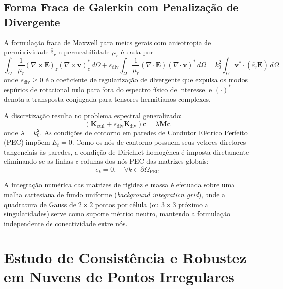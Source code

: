 \documentclass[11pt,a4paper]{article}
\begin{document}
\subsection{Forma Fraca de Galerkin com Penaliza\c{c}\~ao de Divergente}
A formula\c{c}\~ao fraca de Maxwell para meios gerais com anisotropia de permissividade $\overline{\overline{\varepsilon}}_r$ e permeabilidade $\mu_r$ \'e dada por:
\begin{equation}
\int_{\Omega} \frac{1}{\mu_r} (\nabla \times \mathbf{E})_z (\nabla \times \mathbf{v})_z^* \, d\Omega + s_{\mathrm{div}} \int_{\Omega} \frac{1}{\mu_r} (\nabla \cdot \mathbf{E}) (\nabla \cdot \mathbf{v})^* \, d\Omega = k_0^2 \int_{\Omega} \mathbf{v}^* \cdot (\overline{\overline{\varepsilon}}_r \mathbf{E}) \, d\Omega
\end{equation}
onde $s_{\mathrm{div}} \ge 0$ \'e o coeficiente de regulariza\c{c}\~ao de divergente que expulsa os modos esp\'urios de rotacional nulo para fora do espectro f\'isico de interesse, e $(\cdot)^*$ denota a transposta conjugada para tensores hermitianos complexos.

A discretiza\c{c}\~ao resulta no problema espectral generalizado:
\begin{equation}
(\mathbf{K}_{\mathrm{curl}} + s_{\mathrm{div}} \mathbf{K}_{\mathrm{div}}) \mathbf{c} = \lambda \mathbf{M} \mathbf{c}
\end{equation}
onde $\lambda = k_0^2$. As condi\c{c}\~oes de contorno em paredes de Condutor El\'etrico Perfeito (PEC) imp\~oem $E_t = 0$. Como os n\'os de contorno possuem seus vetores diretores tangenciais \`as paredes, a condi\c{c}\~ao de Dirichlet homog\^enea \'e imposta diretamente eliminando-se as linhas e colunas dos n\'os PEC das matrizes globais:
\begin{equation}
e_k = 0, \quad \forall k \in \partial\Omega_{\mathrm{PEC}}
\end{equation}

A integra\c{c}\~ao num\'erica das matrizes de rigidez e massa \'e efetuada sobre uma malha cartesiana de fundo uniforme (\textit{background integration grid}), onde a quadratura de Gauss de $2 \times 2$ pontos por c\'elula (ou $3 \times 3$ pr\'oximo a singularidades) serve como suporte m\'etrico neutro, mantendo a formula\c{c}\~ao independente de conectividade entre n\'os.

\section{Estudo de Consist\^encia e Robustez em Nuvens de Pontos Irregulares}
\end{document}
